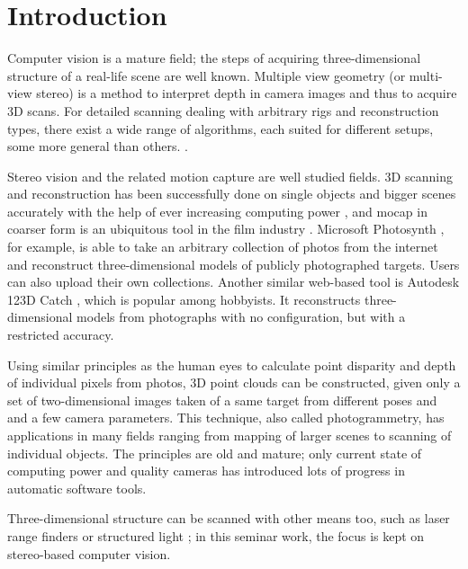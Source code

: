 \section{Introduction}
\thispagestyle{empty}

Computer vision is a mature field; the steps of acquiring three-dimensional structure of a real-life scene are well known.
Multiple view geometry (or multi-view stereo) is a method to interpret depth in camera images and thus to acquire 3D scans.
\cite{hartley03multiview,szeliski10vision,trucco1998introductory,heyden2005multiple}
For detailed scanning dealing with arbitrary rigs and reconstruction types, there exist a wide range of algorithms, each suited for different setups, some more general than others.
\cite{seitz2006comparison}.

Stereo vision and the related motion capture are well studied fields.
3D scanning and reconstruction has been successfully done on single objects and bigger scenes accurately with the help of ever increasing computing power
\cite{goesele2007multi,furukawa2010towards,pollefeys1999hand},
and mocap in coarser form is an ubiquitous tool in the film industry \cite{moeslund2006survey}.
Microsoft Photosynth \cite{photosynth}, for example, is able to take an arbitrary collection of photos from the internet and reconstruct three-dimensional models of publicly photographed targets. Users can also upload their own collections.
Another similar web-based tool is Autodesk 123D Catch \cite{autodeskcatch}, which is popular among hobbyists. It reconstructs three-dimensional models from photographs with no configuration, but with a restricted accuracy.

Using similar principles as the human eyes to calculate point disparity and depth of individual pixels from photos, 3D point clouds can be constructed, given only a set of two-dimensional images taken of a same target from different poses and and a few camera parameters.
\cite{hartley03multiview}
This technique, also called photogrammetry, has applications in many fields ranging from mapping of larger scenes to scanning of individual objects.
The principles are old and mature; only current state of computing power and quality cameras has introduced lots of progress in automatic software tools.

Three-dimensional structure can be scanned with other means too, such as laser range finders \cite{levoy2000digital} or  structured light \cite{rocchini2001low}; in this seminar work, the focus is kept on stereo-based computer vision.

